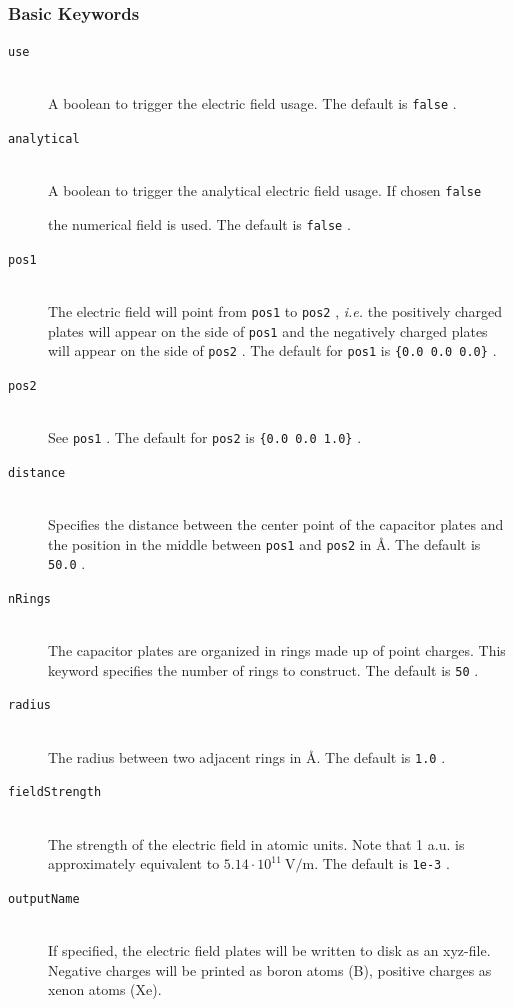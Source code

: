 \documentclass[bibliography=totocnumbered,a4paper,10pt,oneside]{scrbook}
\newcommand{\ttt}[1]{%
  \begingroup\setlength{\fboxsep}{1pt}%
  \colorbox{serenity-green!30}{\texttt{\hspace*{2pt}\vphantom{(g}#1\hspace*{2pt}}}%
  \endgroup
}
\begin{document}
\subsubsection{Basic Keywords}
\begin{description}
  \item [\texttt{use}]\hfill \\
  A boolean to trigger the electric field usage.
  The default is \ttt{false}.
  \item [\texttt{analytical}]\hfill \\
  A boolean to trigger the analytical electric field usage. If chosen \ttt{false}
  the numerical field is used.
  The default is \ttt{false}.
 \item [\texttt{pos1}]\hfill \\
  The electric field will point from \ttt{pos1} to \ttt{pos2}, \emph{i.e.}
  the positively charged plates will appear on the side of \ttt{pos1} and 
  the negatively charged plates will appear on the side of \ttt{pos2}.
  The default for \ttt{pos1} is \ttt{\{0.0 0.0 0.0\}}.
 \item [\texttt{pos2}]\hfill \\
  See \ttt{pos1}.
  The default for \ttt{pos2} is \ttt{\{0.0 0.0 1.0\}}.
 \item [\texttt{distance}]\hfill \\
 Specifies the distance between the center point of the capacitor plates and 
 the position in the middle between \ttt{pos1} and \ttt{pos2} in \AA. The default is \ttt{50.0}.
 \item [\texttt{nRings}]\hfill \\
 The capacitor plates are organized in rings made up of point charges. This keyword specifies the
 number of rings to construct. The default is \ttt{50}.
 \item [\texttt{radius}]\hfill \\
 The radius between two adjacent rings in \AA. The default is \ttt{1.0}.
 \item [\texttt{fieldStrength}]\hfill \\
 The strength of the electric field in atomic units. Note that 1 a.u. is
 approximately equivalent to $5.14\cdot 10^{11}~\mathrm{V/m}$. The default is \ttt{1e-3}.
 \item [\texttt{outputName}]\hfill \\
 If specified, the electric field plates will be written to disk as an xyz-file. Negative
 charges will be printed as boron atoms (B), positive charges as xenon atoms (Xe).
\end{description}
\end{document}
